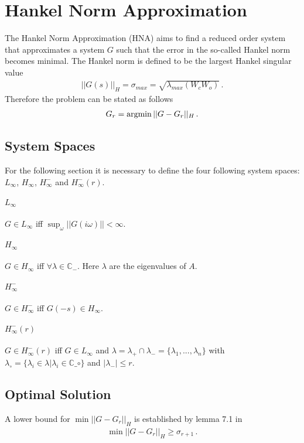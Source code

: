 \section{Hankel Norm Approximation}
The Hankel Norm Approximation (HNA) aims to find a reduced order system that approximates a system \(G\) such that the error in the so-called Hankel norm becomes minimal.
The Hankel norm is defined to be the largest Hankel singular value \cite{singh}
\begin{gather}
||G(s)||_H = \sigma_{max} = \sqrt{\lambda_{max}(W_cW_o)} \,.
\end{gather}
Therefore the problem can be stated as follows
\begin{gather}
G_r = \operatorname*{argmin} ||G - G_r||_H \,. \label{hna-prob}
\end{gather}
\subsection{System Spaces}
For the following section it is necessary to define the four following system spaces: \(L_{\infty}\), \(H_{\infty}\), \(H_{\infty}^-\) and \(H_{\infty}^-(r)\).
\paragraph{\(L_{\infty}\)}
\(G \in L_{\infty}\) iff  \(\sup_{\omega}||G(i\omega)|| < \infty\).
\paragraph{\(H_{\infty}\)}
\(G \in H_{\infty}\) iff  \(\forall \lambda \in \mathbb{C}_{-}\).
Here \(\lambda\) are the eigenvalues of \(A\).
\paragraph{\(H_{\infty}^-\)}
\(G \in H_{\infty}^-\) iff \(G(-s) \in H_{\infty}\).
\paragraph{\(H_{\infty}^-(r)\)}
\(G \in H_{\infty}^-(r)\) iff \(G \in L_{\infty}\) and 
\(\lambda = \lambda_+ \cap \lambda_- = \{\lambda_1, ..., \lambda_n \}\) with \(\lambda_{\circ} = \{\lambda_i \in \lambda | \lambda_i \in \mathbb{C}\_{\circ}\}\) and \(|\lambda_-| \leq r\).


\subsection{Optimal Solution}
A lower bound for \(\min ||G - G_r||_H\) is established by lemma 7.1 in \cite{glover84}
\begin{gather}
\min ||G - G_r||_H \geq \sigma_{r+1} \,.
\end{gather}

